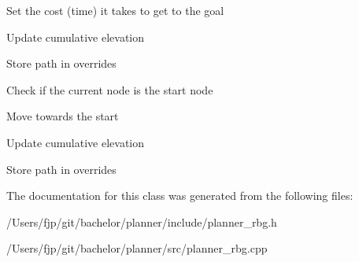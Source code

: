 Set the cost (time) it takes to get to the goal

Update cumulative elevation

Store path in overrides

Check if the current node is the start node

Move towards the start

Update cumulative elevation

Store path in overrides 

The documentation for this class was generated from the following files\+:\begin{DoxyCompactItemize}
\item 
/\+Users/fjp/git/bachelor/planner/include/planner\+\_\+rbg.\+h\item 
/\+Users/fjp/git/bachelor/planner/src/planner\+\_\+rbg.\+cpp\end{DoxyCompactItemize}
